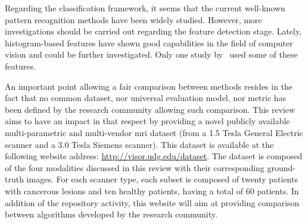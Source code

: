 Regarding the classification framework, it seems that the current well-known pattern recognition methods have been widely studied. However, more investigations should be carried out regarding the feature detection stage. Lately, histogram-based features have shown good capabilities in the field of computer vision and could be further investigated. Only one study by~\cite{Liu2013} used some of these features.

An important point allowing a fair comparison between methods resides in the fact that no common dataset, nor universal evaluation model, nor metric has been defined by the research community allowing such comparison. This review aims to have an impact in that respect by providing a novel publicly available multi-parametric and multi-vendor \ac{mri} dataset (from a 1.5 Tesla General Electric scanner and a 3.0 Tesla Siemens scanner). This dataset is available at the following website address: \url{http://visor.udg.edu/dataset}. The dataset is composed of the four modalities discussed in this review with their corresponding ground-truth images. For each scanner type, each subset is composed of twenty patients with cancerous lesions and ten healthy patients, having a total of 60 patients. In addition of the repository activity, this website will aim at providing comparison between algorithms developed by the research community.

